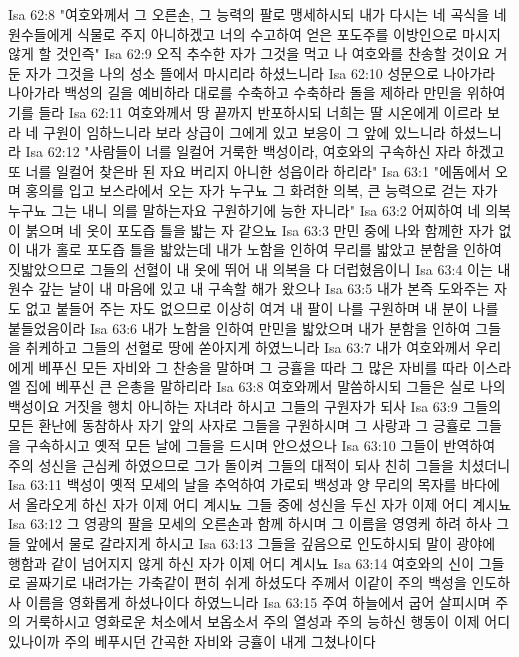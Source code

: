 Isa 62:8  "여호와께서 그 오른손, 그 능력의 팔로 맹세하시되 내가 다시는 네 곡식을 네 원수들에게 식물로 주지 아니하겠고 너의 수고하여 얻은 포도주를 이방인으로 마시지 않게 할 것인즉"
Isa 62:9  오직 추수한 자가 그것을 먹고 나 여호와를 찬송할 것이요 거둔 자가 그것을 나의 성소 뜰에서 마시리라 하셨느니라
Isa 62:10  성문으로 나아가라 나아가라 백성의 길을 예비하라 대로를 수축하고 수축하라 돌을 제하라 만민을 위하여 기를 들라
Isa 62:11  여호와께서 땅 끝까지 반포하시되 너희는 딸 시온에게 이르라 보라 네 구원이 임하느니라 보라 상급이 그에게 있고 보응이 그 앞에 있느니라 하셨느니라
Isa 62:12  "사람들이 너를 일컬어 거룩한 백성이라, 여호와의 구속하신 자라 하겠고 또 너를 일컬어 찾은바 된 자요 버리지 아니한 성읍이라 하리라"
Isa 63:1  "에돔에서 오며 홍의를 입고 보스라에서 오는 자가 누구뇨 그 화려한 의복, 큰 능력으로 걷는 자가 누구뇨 그는 내니 의를 말하는자요 구원하기에 능한 자니라"
Isa 63:2  어찌하여 네 의복이 붉으며 네 옷이 포도즙 틀을 밟는 자 같으뇨
Isa 63:3  만민 중에 나와 함께한 자가 없이 내가 홀로 포도즙 틀을 밟았는데 내가 노함을 인하여 무리를 밟았고 분함을 인하여 짓밟았으므로 그들의 선혈이 내 옷에 뛰어 내 의복을 다 더럽혔음이니
Isa 63:4  이는 내 원수 갚는 날이 내 마음에 있고 내 구속할 해가 왔으나
Isa 63:5  내가 본즉 도와주는 자도 없고 붙들어 주는 자도 없으므로 이상히 여겨 내 팔이 나를 구원하며 내 분이 나를 붙들었음이라
Isa 63:6  내가 노함을 인하여 만민을 밟았으며 내가 분함을 인하여 그들을 취케하고 그들의 선혈로 땅에 쏟아지게 하였느니라
Isa 63:7  내가 여호와께서 우리에게 베푸신 모든 자비와 그 찬송을 말하며 그 긍휼을 따라 그 많은 자비를 따라 이스라엘 집에 베푸신 큰 은총을 말하리라
Isa 63:8  여호와께서 말씀하시되 그들은 실로 나의 백성이요 거짓을 행치 아니하는 자녀라 하시고 그들의 구원자가 되사
Isa 63:9  그들의 모든 환난에 동참하사 자기 앞의 사자로 그들을 구원하시며 그 사랑과 그 긍휼로 그들을 구속하시고 옛적 모든 날에 그들을 드시며 안으셨으나
Isa 63:10  그들이 반역하여 주의 성신을 근심케 하였으므로 그가 돌이켜 그들의 대적이 되사 친히 그들을 치셨더니
Isa 63:11  백성이 옛적 모세의 날을 추억하여 가로되 백성과 양 무리의 목자를 바다에서 올라오게 하신 자가 이제 어디 계시뇨 그들 중에 성신을 두신 자가 이제 어디 계시뇨
Isa 63:12  그 영광의 팔을 모세의 오른손과 함께 하시며 그 이름을 영영케 하려 하사 그들 앞에서 물로 갈라지게 하시고
Isa 63:13  그들을 깊음으로 인도하시되 말이 광야에 행함과 같이 넘어지지 않게 하신 자가 이제 어디 계시뇨
Isa 63:14  여호와의 신이 그들로 골짜기로 내려가는 가축같이 편히 쉬게 하셨도다 주께서 이같이 주의 백성을 인도하사 이름을 영화롭게 하셨나이다 하였느니라
Isa 63:15  주여 하늘에서 굽어 살피시며 주의 거룩하시고 영화로운 처소에서 보옵소서 주의 열성과 주의 능하신 행동이 이제 어디 있나이까 주의 베푸시던 간곡한 자비와 긍휼이 내게 그쳤나이다
